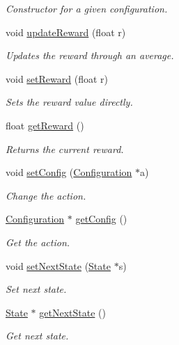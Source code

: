 \begin{DoxyCompactItemize}
\begin{DoxyCompactList}\small\item\em Constructor for a given configuration. \end{DoxyCompactList}\item 
void \hyperlink{classAction_a23899eb8bebdca42593c247cabfaec81}{update\-Reward} (float r)
\begin{DoxyCompactList}\small\item\em Updates the reward through an average. \end{DoxyCompactList}\item 
void \hyperlink{classAction_a62c0e418aeb551df53a81d865b945274}{set\-Reward} (float r)
\begin{DoxyCompactList}\small\item\em Sets the reward value directly. \end{DoxyCompactList}\item 
float \hyperlink{classAction_a55e478501297fabc56274c5a71fa84a4}{get\-Reward} ()
\begin{DoxyCompactList}\small\item\em Returns the current reward. \end{DoxyCompactList}\item 
void \hyperlink{classAction_adc70d557ee3bd8653cbdb06dc16532c2}{set\-Config} (\hyperlink{classConfiguration}{Configuration} $\ast$a)
\begin{DoxyCompactList}\small\item\em Change the action. \end{DoxyCompactList}\item 
\hyperlink{classConfiguration}{Configuration} $\ast$ \hyperlink{classAction_ad2a8ab7fdc13f86ef84efe4435b32e61}{get\-Config} ()
\begin{DoxyCompactList}\small\item\em Get the action. \end{DoxyCompactList}\item 
void \hyperlink{classAction_a357c36b42542755e9b2752412080b4dd}{set\-Next\-State} (\hyperlink{classState}{State} $\ast$s)
\begin{DoxyCompactList}\small\item\em Set next state. \end{DoxyCompactList}\item 
\hyperlink{classState}{State} $\ast$ \hyperlink{classAction_a3b1290eec402e84aef5d823f4ac7b128}{get\-Next\-State} ()
\begin{DoxyCompactList}\small\item\em Get next state. \end{DoxyCompactList}\end{DoxyCompactItemize}



